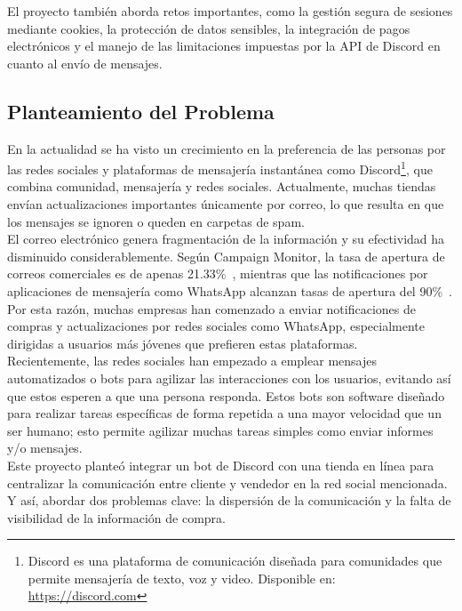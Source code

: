 \documentclass[a4paper,12pt]{article}
\begin{document}
El proyecto también aborda retos importantes, como la gestión segura de sesiones mediante cookies, la protección de datos sensibles, la integración de pagos electrónicos y el manejo de las limitaciones impuestas por la API de Discord en cuanto al envío de mensajes. 

\newpage

\subsection{Planteamiento del Problema}

En la actualidad se ha visto un crecimiento en la preferencia de las personas por las redes sociales y plataformas de mensajería instantánea como Discord\footnote{Discord es una plataforma de comunicación diseñada para comunidades que permite mensajería de texto, voz y video. Disponible en: \url{https://discord.com}}, que combina comunidad, mensajería y redes sociales. Actualmente, muchas tiendas envían actualizaciones importantes únicamente por correo, lo que resulta en que los mensajes se ignoren o queden en carpetas de spam.\\

El correo electrónico genera fragmentación de la información y su efectividad ha disminuido considerablemente. Según Campaign Monitor, la tasa de apertura de correos comerciales es de apenas 21.33\%~\cite{campaignmonitor}, mientras que las notificaciones por aplicaciones de mensajería como WhatsApp alcanzan tasas de apertura del 90\%~\cite{mma2023}. Por esta razón, muchas empresas han comenzado a enviar notificaciones de compras y actualizaciones por redes sociales como WhatsApp, especialmente dirigidas a usuarios más jóvenes que prefieren estas plataformas.\\

Recientemente, las redes sociales han empezado a emplear mensajes automatizados o bots para agilizar las interacciones con los usuarios, evitando así que estos esperen a que una persona responda. Estos bots son software diseñado para realizar tareas específicas de forma repetida a una mayor velocidad que un ser humano; esto permite agilizar muchas tareas simples como enviar informes y/o mensajes.\\

Este proyecto planteó integrar un bot de Discord con una tienda en línea para centralizar la comunicación entre cliente y vendedor en la red social mencionada. Y así, abordar dos problemas clave: la dispersión de la comunicación y la falta de visibilidad de la información de compra.\\ 
 
\end{document}
